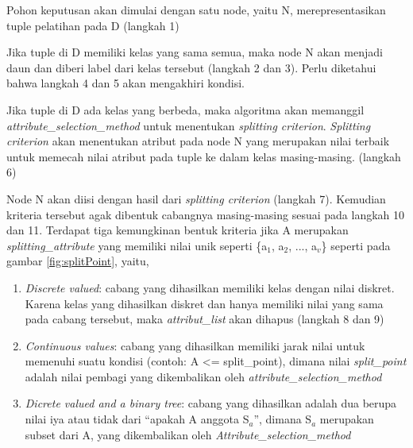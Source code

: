 


%





Pohon keputusan akan dimulai dengan satu node, yaitu N, merepresentasikan tuple pelatihan pada D (langkah 1)

Jika tuple di D memiliki kelas yang sama semua, maka node N akan menjadi daun dan diberi label dari kelas tersebut (langkah 2 dan 3). Perlu diketahui bahwa langkah 4 dan 5 akan mengakhiri kondisi.

Jika tuple di D ada kelas yang berbeda, maka algoritma akan memanggil \textsl{attribute\_selection\_method} untuk menentukan \textsl{splitting criterion}. \textsl{Splitting criterion} akan menentukan atribut pada node N yang merupakan nilai terbaik untuk memecah nilai atribut pada tuple ke dalam kelas masing-masing. (langkah 6)

Node N akan diisi dengan hasil dari \textsl{splitting criterion} (langkah 7). Kemudian kriteria tersebut agak dibentuk cabangnya masing-masing sesuai pada langkah 10 dan 11. Terdapat tiga kemungkinan bentuk kriteria jika A merupakan \textsl{splitting\_attribute} yang memiliki nilai unik seperti \{a$_{1}$, a$_{2}$, ..., a$_{v}$\} seperti pada gambar \ref{fig:splitPoint}, yaitu,

\begin{enumerate}
	\item \textsl{Discrete valued}: cabang yang dihasilkan memiliki kelas dengan nilai diskret. Karena kelas yang dihasilkan diskret dan hanya memiliki nilai yang sama pada cabang tersebut, maka \textsl{attribut\_list} akan dihapus (langkah 8 dan 9)
	\item \textsl{Continuous values}: cabang yang dihasilkan memiliki jarak nilai untuk memenuhi suatu kondisi (contoh: A <= split\_point), dimana nilai \textsl{split\_point} adalah nilai pembagi yang dikembalikan oleh \textsl{attribute\_selection\_method}
	\item \textsl{Dicrete valued and a binary tree}: cabang yang dihasilkan adalah dua berupa nilai iya atau tidak dari "`apakah A anggota S$_{a}$"', dimana S$_{a}$ merupakan subset dari A, yang dikembalikan oleh \textsl{Attribute\_selection\_method}
\end{enumerate}


